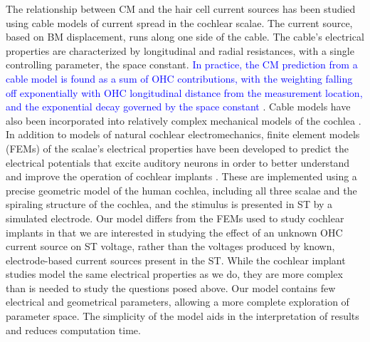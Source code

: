 \documentclass{biophys-new}
\begin{document}
\par{The relationship between CM and the hair cell current sources has been studied using cable models of current spread in the cochlear scalae. The current source, based on BM displacement, runs along one side of the cable.  The cable's electrical properties are characterized by longitudinal and radial resistances, with a single controlling parameter, the space constant. \textcolor{blue}{In practice, the CM prediction from a cable model is found as a sum of OHC contributions, with the weighting falling off exponentially with OHC longitudinal distance from the measurement location, and the exponential decay governed by the space constant} \cite{strelioff,dongolson,fridberger,patuzzi,cheatham2011, johnstone1966}.  Cable models have also been incorporated into relatively complex mechanical models of the cochlea \cite{ayat,ramamoorthy}.  In addition to models of natural cochlear electromechanics, finite element models (FEMs) of the scalae's electrical properties have been developed to predict the electrical potentials that excite auditory neurons in order to better understand and improve the operation of cochlear implants  \cite{briaire_frijns,hanekom,nogueira}. These are implemented using a precise geometric model of the human cochlea, including all three scalae and the spiraling structure of the cochlea, and the stimulus is presented in ST by a simulated electrode.  Our model differs from the FEMs used to study cochlear implants in that we are interested in studying the effect of an unknown OHC current source on ST voltage, rather than the voltages produced by known, electrode-based current sources present in the ST. While the cochlear implant studies model the same electrical properties as we do, they are more complex than is needed to study the questions posed above. Our model contains few electrical and geometrical parameters, allowing a more complete exploration of parameter space. The simplicity of the model aids in the interpretation of results and reduces computation time. }
\end{document}
